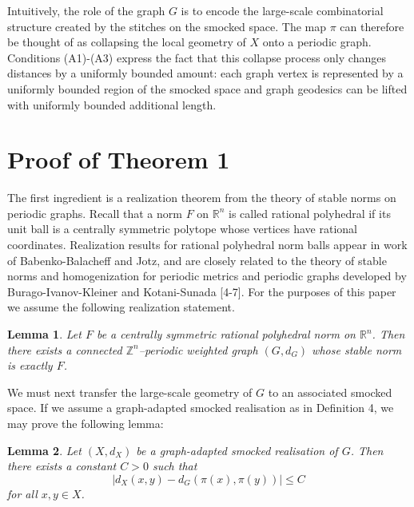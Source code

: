 \documentclass[12pt, letterpaper]{article}
\newtheorem{lemma}{Lemma}
\begin{document}
\noindent
Intuitively, the role of the graph $G$ is to encode the large-scale combinatorial structure created by the stitches on the smocked space.  The map $\pi$ can therefore be thought of as collapsing the local geometry of $X$ onto a periodic graph.  Conditions (A1)-(A3) express the fact that this collapse process only changes distances by a uniformly bounded amount: each graph vertex is represented by a uniformly bounded region of the smocked space and graph geodesics can be lifted with uniformly bounded additional length.





\section{Proof of Theorem 1}

\noindent
The first ingredient is a realization theorem from the theory of stable
norms on periodic graphs. Recall that a norm $F$ on $\mathbb R^n$ is
called rational polyhedral if its unit ball is a centrally symmetric
polytope whose vertices have rational coordinates.  
 Realization results for rational polyhedral norm balls appear
in work of Babenko-Balacheff and Jotz, and are closely related to the theory of stable norms
and homogenization for periodic metrics and periodic graphs developed by
Burago-Ivanov-Kleiner and Kotani-Sunada [4-7]. For the purposes of this paper we assume the
following realization statement.



\begin{lemma} \label{thm:stable_realisation}
Let $F$ be a centrally symmetric rational polyhedral norm on
$\mathbb R^n$. Then there exists a connected $\mathbb Z^n$--periodic
weighted graph $(G,d_G)$ whose stable norm is exactly $F$.
\end{lemma}


\noindent
We must next transfer the
large-scale geometry of $G$ to an associated smocked space.  If we assume a graph-adapted smocked realisation as in Definition 4, we may prove the following lemma:




\begin{lemma}
\label{prop:additive}
Let $(X,d_X)$ be a graph-adapted smocked realisation of $G$.  Then there exists a constant $C>0$ such that
\[
\bigl|
d_X(x,y)-d_G(\pi(x),\pi(y))
\bigr|
\le C
\]
for all $x,y\in X$.
\end{lemma}
\end{document}

